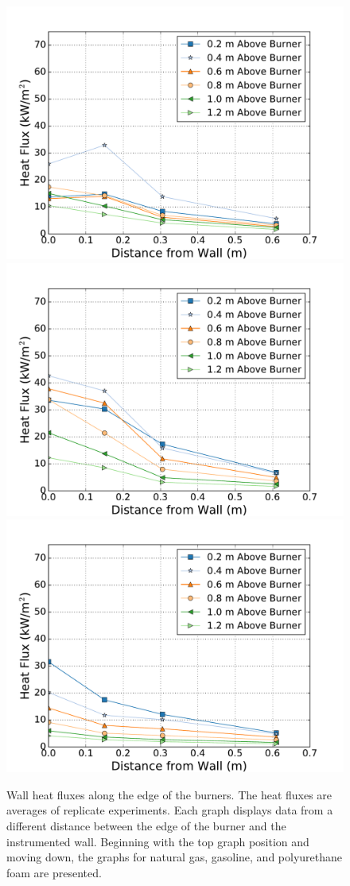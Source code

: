 \documentclass[twoside]{uocthesis}
\begin{document}
{\begin{figure}[p]
	\centering
	\includegraphics[width=.6\columnwidth]{../Figures/NCTW_NG_HF_Offset_Avg} \\
	\includegraphics[width=.6\columnwidth]{../Figures/NCTW_GAS_HF_Offset_Avg}\\
	\includegraphics[width=.6\columnwidth]{../Figures/NCTW_PUF_HF_Offset_Avg} \\
	\caption[Wall heat flux along the edge of the burners]{Wall heat fluxes along the edge of the burners.  The heat fluxes are averages of replicate experiments. Each graph displays data from a different distance between the edge of the burner and the instrumented wall.  Beginning with the top graph position and moving down, the graphs for natural gas, gasoline, and polyurethane foam are presented.}
	\label{NCTW_HF_Edge_Comp}
\end{figure}

}
\end{document}
